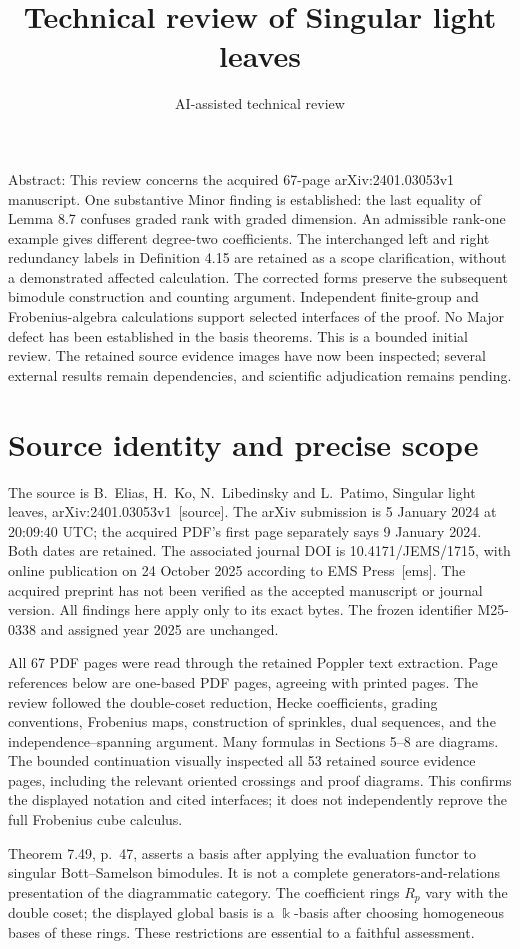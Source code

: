 \documentclass[10pt]{article}
\title{Technical review of
Singular light leaves}
\author{AI-assisted technical review}
\date{}
\begin{document}
\maketitle
Abstract: This review concerns the acquired 67-page arXiv:2401.03053v1 manuscript. One substantive Minor finding is established: the last equality of Lemma 8.7 confuses graded rank with graded dimension. An admissible rank-one example gives different degree-two coefficients. The interchanged left and right redundancy labels in Definition 4.15 are retained as a scope clarification, without a demonstrated affected calculation. The corrected forms preserve the subsequent bimodule construction and counting argument. Independent finite-group and Frobenius-algebra calculations support selected interfaces of the proof. No Major defect has been established in the basis theorems. This is a bounded initial review. The retained source evidence images have now been inspected; several external results remain dependencies, and scientific adjudication remains pending.\par
\section*{Source identity and precise scope}
The source is B. Elias, H. Ko, N. Libedinsky and L. Patimo, Singular light leaves, arXiv:2401.03053v1 [source]. The arXiv submission is 5 January 2024 at 20:09:40 UTC; the acquired PDF’s first page separately says 9 January 2024. Both dates are retained. The associated journal DOI is 10.4171/JEMS/1715, with online publication on 24 October 2025 according to EMS Press [ems]. The acquired preprint has not been verified as the accepted manuscript or journal version. All findings here apply only to its exact bytes. The frozen identifier M25-0338 and assigned year 2025 are unchanged.\par
All 67 PDF pages were read through the retained Poppler text extraction. Page references below are one-based PDF pages, agreeing with printed pages. The review followed the double-coset reduction, Hecke coefficients, grading conventions, Frobenius maps, construction of sprinkles, dual sequences, and the independence–spanning argument. Many formulas in Sections 5–8 are diagrams. The bounded continuation visually inspected all 53 retained source evidence pages, including the relevant oriented crossings and proof diagrams. This confirms the displayed notation and cited interfaces; it does not independently reprove the full Frobenius cube calculus.\par
Theorem 7.49, p. 47, asserts a basis after applying the evaluation functor to singular Bott–Samelson bimodules. It is not a complete generators-and-relations presentation of the diagrammatic category. The coefficient rings \(R_p\) vary with the double coset; the displayed global basis is a \(\Bbbk\)-basis after choosing homogeneous bases of these rings. These restrictions are essential to a faithful assessment.\par
\end{document}
